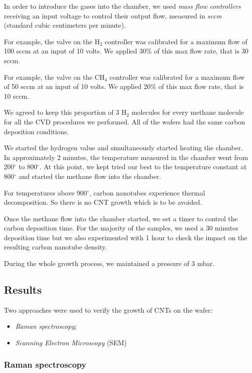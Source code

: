 \documentclass[a4paper,12pt,twoside]{article}
\begin{document}
In order to introduce the gases into the chamber, we used \textit{mass flow controllers} receiving an input voltage to control their output flow, measured in \textit{sccm} (standard cubic centimeters per minute).

For example, the valve on the H$_2$ controller was calibrated for a maximum flow of 100 sccm at an input of 10 volts. We applied $30\%$ of this max flow rate, that is 30 sccm.

For example, the valve on the CH$_4$ controller was calibrated for a maximum flow of 50 sccm at an input of 10 volts. We applied $20\%$ of this max flow rate, that is 10 sccm.

We agreed to keep this proportion of 3 H$_2$ molecules for every methane molecule for all the CVD procedures we performed. All of the wafers had the same carbon deposition conditions.

We started the hydrogen value and simultaneously started heating the chamber. In approximately 2 minutes, the temperature measured in the chamber went from 200$^\circ$ to 800$^\circ$. At this point, we kept tried our best to the temperature constant at 800$^\circ$ and started the methane flow into the chamber.

For temperatures above 900$^\circ$, carbon nanotubes experience thermal decomposition. So there is no CNT growth which is to be avoided.

Once the methane flow into the chamber started, we set a timer to control the carbon deposition time. For the majority of the samples, we used a 30 minutes deposition time but we also experimented with 1 hour to check the impact on the resulting carbon nanotube density.

During the whole growth process, we maintained a pressure of $3$ mbar.

\subsection{Results}

Two approaches were used to verify the growth of CNTs on the wafer:

\begin{itemize}
    \item \textit{Raman spectroscopy};
    \item \textit{Scanning Electron Microscopy} (SEM)
\end{itemize}

\subsubsection{Raman spectroscopy}
\end{document}
